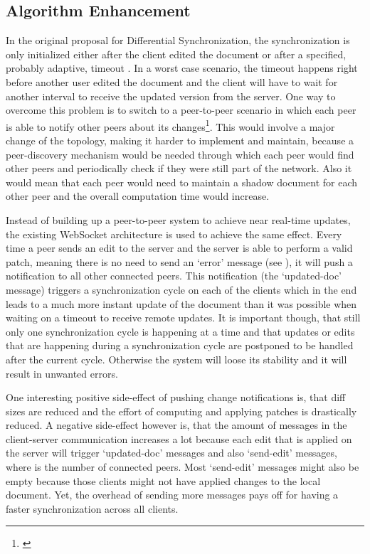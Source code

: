 \subsection{Algorithm Enhancement}
\label{subsec:ds-algo-enhancement}

In the original proposal for Differential Synchronization, the synchronization is only initialized either after the client edited the document or after a specified, probably adaptive, timeout \cite{fraser2009differential}. In a worst case scenario, the timeout happens right before another user edited the document and the client will have to wait for another interval to receive the updated version from the server. One way to overcome this problem is to switch to a peer-to-peer scenario in which each peer is able to notify other peers about its changes\footnote{\cite[p. 4f]{fraser2009differential}}. This would involve a major change of the topology, making it harder to implement and maintain, because a peer-discovery mechanism would be needed through which each peer would find other peers and periodically check if they were still part of the network. Also it would mean that each peer would need to maintain a shadow document for each other peer and the overall computation time would increase. 

Instead of building up a peer-to-peer system to achieve near real-time updates, the existing WebSocket architecture is used to achieve the same effect. Every time a peer sends an edit to the server and the server is able to perform a valid patch, meaning there is no need to send an `error' message (see ), it will push a notification to all other connected peers. This notification (the `updated-doc' message) triggers a synchronization cycle on each of the clients which in the end leads to a much more instant update of the document than it was possible when waiting on a timeout to receive remote updates. It is important though, that still only one synchronization cycle is happening at a time and that updates or edits that are happening during a synchronization cycle are postponed to be handled after the current cycle. Otherwise the system will loose its stability and it will result in unwanted errors.

One interesting positive side-effect of pushing change notifications is, that diff sizes are reduced and the effort of computing and applying patches is drastically reduced. A negative side-effect however is, that the amount of messages in the client-server communication increases a lot because each edit that is applied on the server will trigger  `updated-doc' messages and also  `send-edit' messages, where  is the number of connected peers. Most `send-edit' messages might also be empty because those clients might not have applied changes to the local document. Yet, the overhead of sending more messages pays off for having a faster synchronization across all clients.

